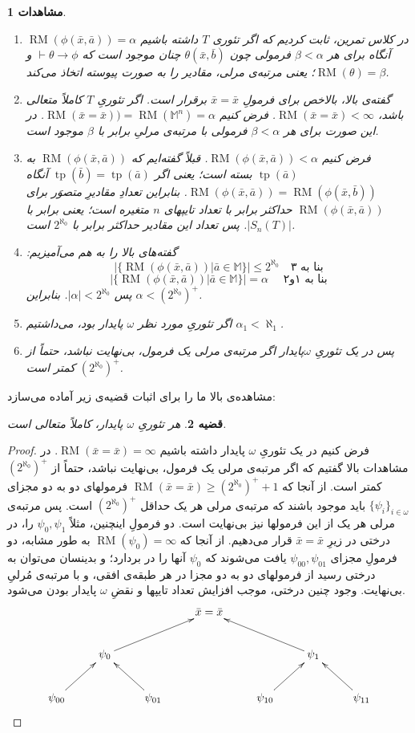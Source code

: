 \documentclass[12pt,a4paper]{report}
\theoremstyle{colorhead}
\newtheorem{thm}{قضیه}
\newtheorem{moshahedat}[thm]{مشاهدات}
\DeclareMathOperator{\RM}{RM}
\DeclareMathOperator{\tp}{tp}
\begin{document}
\begin{moshahedat}
\hfill
\begin{enumerate}
\item 
در کلاس تمرین، ثابت کردیم که اگر تئوری
$T$
داشته باشیم
$\RM(\phi(\bar{x},\bar{a}))=\alpha$
آنگاه برای هر
$\beta<\alpha$
فرمولی چون
$\theta(\bar{x},\bar{b})$
چنان موجود است که 
$\vdash \theta\to \phi$
و
$\RM(\theta)=\beta$؛
یعنی مرتبه‌ی مرلی، مقادیر را به صورت پیوسته اتخاذ می‌کند. 
\item 
گفته‌ی بالا، بالاخص برای فرمولِ
$\bar{x}=\bar{x}$
برقرار است. اگر تئوریِ
$T$
کاملاً متعالی باشد، 
$\RM(\bar{x}=\bar{x})<\infty$.
فرض کنیم
$\RM(\bar{x}=\bar{x}))=\RM(\mathbb{M}^n)=\alpha$.
در این صورت برای هر 
$\beta<\alpha$
فرمولی با مرتبه‌ی مرلیِ برابر با
$\beta$
موجود است.
\item  
 فرض کنیم
$\RM(\phi(\bar{x},\bar{a}))<\alpha$.
قبلاً گفته‌ایم که 
$\RM(\phi(\bar{x},\bar{a}))$
به
$\tp(\bar{a})$
بسته است؛ یعنی اگر
$\tp(\bar{b})=\tp(\bar{a})$
آنگاه
$\RM(\phi(\bar{x},\bar{a}))=\RM(\phi(\bar{x},\bar{b}))$.
بنابراین تعدادِ مقادیرِ متصوَر برای
$\RM(\phi(\bar{x},\bar{a}))$
حداکثر برابر با تعداد تایپهای 
$n$
متغیره است؛ یعنی برابر با
$|S_n(T)|$.
پس تعداد این مقادیر حداکثر برابر با
$2^{\aleph_0}$
است. 
\item 
گفته‌های بالا را به هم می‌‌آمیزیم:
\[
|\{\RM(\phi(\bar{x},\bar{a}))|\bar{a}\in \mathbb{M}\}|\leq 2^{\aleph_0}
\quad \text{بنا به ۳}
\]
\[
|\{\RM(\phi(\bar{x},\bar{a}))|\bar{a}\in \mathbb{M}\}|=\alpha
\quad \text{  بنا به ۱و۲} 
\]
پس
$|\alpha|<2^{\aleph_0}$.
بنابراین
$\alpha<(2^{\aleph_0})^+$.
\item 
اگر تئوریِ مورد نظر
$\omega$
پایدار بود، می‌داشتیم
$\alpha_1<\aleph_1$.
\item 
پس 
در یک تئوریِ
$\omega$پایدار
اگر مرتبه‌ی مرلی یک فرمول، بی‌نهایت نباشد، حتماً
از
$(2^{\aleph_0})^+$
کمتر است.
\end{enumerate}
\end{moshahedat}
مشاهده‌ی بالا ما را برای اثبات قضیه‌ی زیر آماده می‌سازد:
\begin{thm}
هر تئوریِ
$\omega$
پایدار، کاملاً متعالی است. 
\end{thm}
\begin{proof}
فرض کنیم در یک تئوریِ
$\omega$
پایدار داشته باشیم
$\RM(\bar{x}=\bar{x})=\infty$.
در مشاهدات بالا گفتیم که اگر مرتبه‌ی مرلی یک فرمول، بی‌نهایت نباشد، حتماً
از
$(2^{\aleph_0})^+$
کمتر است. از آنجا که 
$\RM(\bar{x}=\bar{x})\geq (2^{\aleph_0})^+ +1$
فرمولهای
دو به دو مجزای
$\{\psi_i\}_{i\in \omega}$
باید موجود باشند که مرتبه‌ی مرلی هر یک حداقل
$(2^{\aleph_0})^+$
است. 
پس مرتبه‌ی مرلی هر یک از این فرمولها نیز بی‌نهایت است. دو فرمولِ اینچنین، مثلاً
$\psi_{0},\psi_1$
را، در درختی در زیرِ
$\bar{x}=\bar{x}$
قرار می‌دهیم. از آنجا که 
$\RM(\psi_0)=\infty$
به طور مشابه، دو فرمولِ مجزای
$\psi_{00},\psi_{01}$
یافت می‌شوند که 
$\psi_0$
آنها را در بردارد؛ و بدینسان می‌توان به درختی رسید از فرمولهای دو به دو مجزا در هر طبقه‌ی افقی، و  با مرتبه‌ی مُرلیِ بی‌نهایت. وجود چنین درختی،
موجب افزایش تعداد تایپها و نقضِ
$\omega$
پایدار بودن می‌شود.
\[
\xymatrix{
& & & \bar{x}=\bar{x}\\
& \psi_0\ar[urr] & & & & \psi_1\ar[ull]\\
\psi_{00}\ar[ur]& & \psi_{01}\ar[ul]& & \psi_{10}\ar[ur] & &\psi_{11}\ar[ul]
}
\]
\end{proof}
\end{document}
